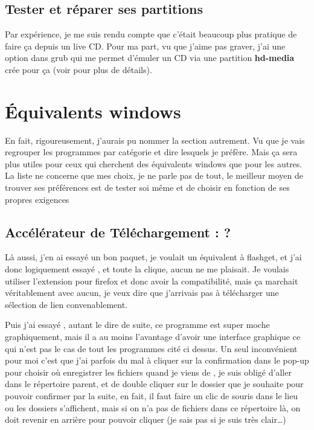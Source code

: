 \documentclass[a4paper,twoside]{article}
\begin{document}
\subsection{Tester et réparer ses partitions}
Par expérience, je me suis rendu compte que c'était beaucoup plus pratique de faire ça depuis un live CD. Pour ma part, vu que j'aime pas graver, j'ai une option dans grub qui me permet d'émuler un CD via une partition \textbf{hd-media} crée pour ça (voir  pour plus de détails).


\section{\'Equivalents windows}
En fait, rigoureusement, j'aurais pu nommer la section autrement. Vu que je vais regrouper les programmes par catégorie et dire lesquels je préfère. Mais ça sera plus utiles pour ceux qui cherchent des équivalents windows que pour les autres.
{\red La liste ne concerne que mes choix, je ne parle pas de tout, le meilleur moyen de trouver ses préférences est de tester soi même et de choisir en fonction de ses propres exigences}

\subsection{Accélérateur de Téléchargement : ?}
Là aussi, j'en ai essayé un bon paquet, je voulait un équivalent à flashget, et j'ai donc logiquement essayé ,  et toute la clique, aucun ne me plaisait. Je voulais utiliser l'extension  pour firefox et donc avoir la compatibilité, mais ça marchait véritablement avec aucun, je veux dire que j'arrivais pas à télécharger une sélection de lien convenablement.

Puis j'ai essayé , autant le dire de suite, ce programme est super moche graphiquement, mais il a au moins l'avantage d'avoir une interface graphique ce qui n'est pas le cas de tout les programmes cité ci dessus. Un seul inconvénient pour moi c'est que j'ai parfois du mal à cliquer sur la confirmation dans le pop-up pour choisir où enregistrer les fichiers quand je viens de , je suis obligé d'aller dans le répertoire parent, et de double cliquer sur le dossier que je souhaite pour pouvoir confirmer par la suite, en fait, il faut faire un clic de souris dans le lieu ou les dossiers s'affichent, mais si on n'a pas de fichiers dans ce répertoire là, on doit revenir en arrière pour pouvoir cliquer (je sais pas si je suis très clair\dots)
\end{document}
